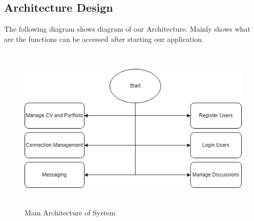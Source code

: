 \subsection{Architecture Design}
The following diagram shows diagram of our Architecture. Mainly shows what are the functions can be accessed after starting our application.
\begin{figure}[H]
    \includegraphics[height = 8cm]{Diagrams/Main_Block.png}
    \caption{Main Architecture of System}
\end{figure}
\newpage
